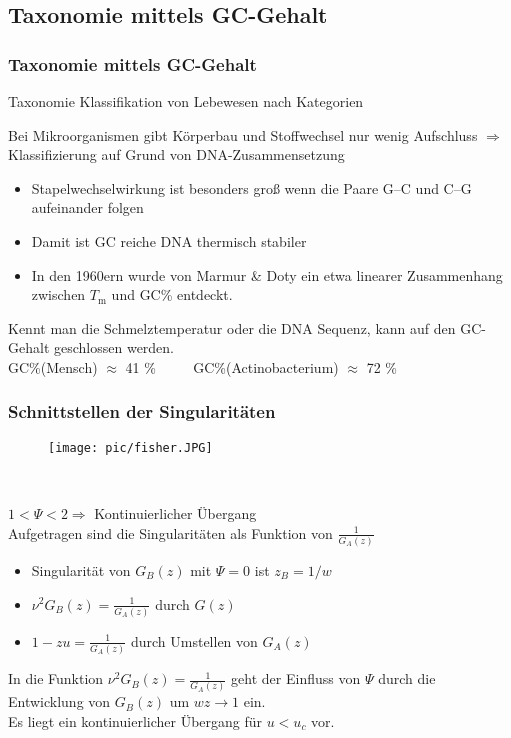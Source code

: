 \subsection*{Taxonomie mittels GC-Gehalt}
\begin{frame}
\frametitle{Taxonomie mittels GC-Gehalt}
\begin{block}{Taxonomie}
Klassifikation von Lebewesen nach Kategorien
\end{block}
\centering
Bei Mikroorganismen gibt Körperbau und Stoffwechsel nur wenig Aufschluss
$\Rightarrow$ Klassifizierung auf Grund von DNA-Zusammensetzung
\vspace{0.3cm}
\begin{itemize}
\item Stapelwechselwirkung ist besonders groß wenn die Paare G--C und C--G aufeinander folgen
\item Damit ist GC reiche DNA thermisch stabiler
\item In den 1960ern wurde von Marmur \& Doty ein etwa linearer Zusammenhang zwischen $T_\text{m}$ und GC\% entdeckt.
\end{itemize}
Kennt man die Schmelztemperatur oder die DNA Sequenz, kann auf den GC-Gehalt geschlossen werden.\\

\vspace{0.5cm}
GC\%(Mensch) $\approx$ 41 \% $\qquad$ GC\%(Actinobacterium) $\approx$ 72 \%
\end{frame}




\begin{frame}
\frametitle{Schnittstellen der Singularitäten}
\begin{minipage}{5.5cm}
\begin{figure}
	\centering
		\texttt{[image: pic/fisher.JPG]}
\end{figure}
\centering \tiny \cite{FIS84}\\
\end{minipage}
\begin{minipage}{5cm}
\tiny

\begin{flushleft}

$1<\Psi<2\Rightarrow$ Kontinuierlicher Übergang\\
Aufgetragen sind die Singularitäten als Funktion von $\frac{1}{G_A(z)}$
\begin{itemize}
\item Singularität von $G_B(z)$ mit $\Psi=0$ ist $z_B=1/w$
\item $\nu^2 G_B(z)=\frac{1}{G_A(z)}$ durch $G(z)$
\item  $1-zu=\frac{1}{G_A(z)}$ durch Umstellen von $G_A(z)$
\end{itemize}
\end{flushleft}
\end{minipage}

  
\vspace{0.3cm}
\tiny
In die Funktion $\nu^2 G_B(z)=\frac{1}{G_A(z)}$ geht der Einfluss von $\Psi$ durch die Entwicklung von $G_B(z)$ um $wz\rightarrow1$ ein.\\
Es liegt ein kontinuierlicher Übergang für $u<u_c$ vor.
\end{frame}


